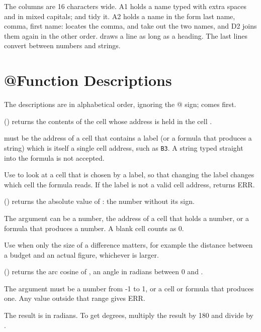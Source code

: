 The columns are 16 characters wide. A1 holds a name typed with extra
spaces and in mixed capitals;  and  tidy it. A2
holds a name in the form last name, comma, first name:  locates
the comma,  and  take out the two names, and D2 joins
them again in the other order.  draws a line as long as a
heading. The last lines convert between numbers and strings.


\section{@Function Descriptions}
The descriptions are in alphabetical order, ignoring the @ sign;  comes first.

() returns the contents of the cell whose address is held in the cell .

 must be the address of a cell that contains a label (or a formula that produces a string) which is itself a single cell address, such as \texttt{B3}. A string typed straight into the formula is not accepted.

Use  to look at a cell that is chosen by a label, so that changing the label changes which cell the formula reads. If the label is not a valid cell address,  returns ERR.

\Examples
{}

() returns the absolute value of : the number without its sign.

The argument  can be a number, the address of a cell that holds a number, or a formula that produces a number. A blank cell counts as 0.

Use  when only the size of a difference matters, for example the distance between a budget and an actual figure, whichever is larger.

\Examples
{}

() returns the arc cosine of , an angle in radians between 0 and .

The argument  must be a number from -1 to 1, or a cell or formula that produces one. Any value outside that range gives ERR.

The result is in radians. To get degrees, multiply the result by 180 and divide by .

